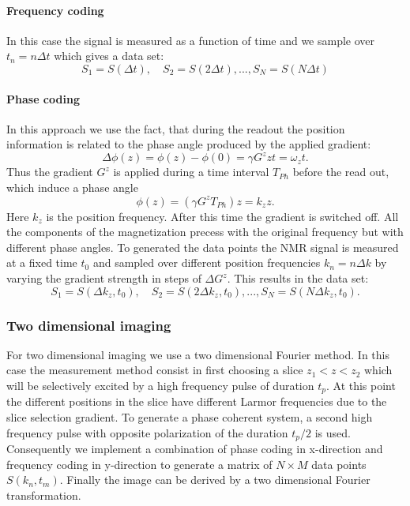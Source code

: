 \paragraph{Frequency coding}
In this case the signal is measured as a function of time and we sample over $t_n = n\Delta t$ which gives a data set:
$$S_1 = S(\Delta t), \quad S_2 = S(2\Delta t), ..., S_N = S(N\Delta t)$$
\paragraph{Phase coding}
In this approach we use the fact, that during the readout the position information is related to the phase angle produced by the applied gradient:
\begin{equation}
\Delta \phi(z)= \phi(z)-\phi(0) = \gamma G^z z t= \omega_z t.
\end{equation}
Thus the gradient  $G^z$ is applied during a time interval $T_{Ph}$ before the read out, which induce a phase angle \begin{equation}
\phi(z) = (\gamma G^z T_{Ph})z = k_z z.
\end{equation}
Here $k_z$ is the position frequency. After this time the gradient is switched off. All the components of the magnetization precess with the original frequency but with different phase angles.  
To generated the data points the NMR signal is measured at a fixed time $t_0$ and sampled over different position frequencies $k_n = n\Delta k$ by varying the gradient strength in steps of $\Delta G^z$.  This results in the data set: 
$$S_1 = S(\Delta k_z,t_0), \quad S_2 = S(2\Delta k_z, t_0), ..., S_N = S(N\Delta k_z, t_0).$$

\subsubsection{Two dimensional imaging}
For two dimensional imaging we use a two dimensional Fourier method. In this case the measurement method consist in first choosing a slice $z_1 < z < z_2$ which will be selectively excited by a high frequency pulse of duration $t_p$. At this point the different positions in the slice have different Larmor frequencies due to the slice selection gradient. To generate a phase coherent system, a second high frequency pulse with opposite polarization of the duration $t_p/2$ is used. Consequently we implement a combination of phase coding in x-direction and frequency coding in y-direction to generate a matrix of $N\times M$ data points $S(k_n, t_m)$. Finally the image can be derived by a two dimensional Fourier transformation. 














